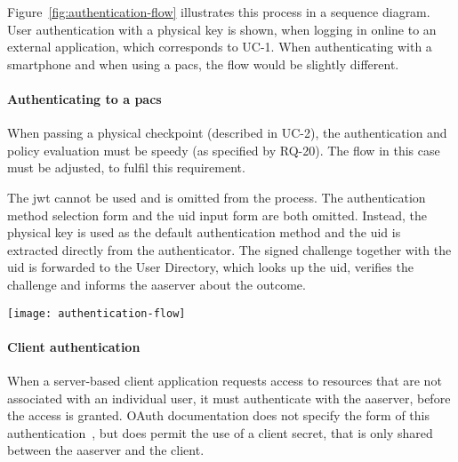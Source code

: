 Figure~\ref{fig:authentication-flow} illustrates this process in a sequence diagram. User authentication with a physical key is shown, when logging in online to an external application, which corresponds to UC-1. When authenticating with a smartphone and when using a \acrshort{pacs}, the flow would be slightly different.

\paragraph{Authenticating to a \acrshort{pacs}} 
When passing a physical checkpoint (described in UC-2), the authentication and policy evaluation must be speedy (as specified by RQ-20). The flow in this case must be adjusted, to fulfil this requirement.

The \acrshort{jwt} cannot be used and is omitted from the process. The authentication method selection form and the \acrshort{uid} input form are both omitted. Instead, the physical key is used as the default authentication method and the \acrshort{uid} is extracted directly from the authenticator. The signed challenge together with the \acrshort{uid} is forwarded to the User Directory, which looks up the \acrshort{uid}, verifies the challenge and informs the \acrshort{aaserver} about the outcome.

\begin{sidewaysfigure}[tpb]
    \centering
    \texttt{[image: authentication-flow]}
    \caption{Authentication flow during online access control with a server-based client, using a physical authenticator. If the authentication is not successful, the \acrshort{aaserver} informs the client and the user about the unsuccessful authentication and does not continue to the Access policy evaluation stage.}
    \label{fig:authentication-flow}
\end{sidewaysfigure}
\restoregeometry

\paragraph{Client authentication}
When a server-based client application requests access to resources that are not associated with an individual user, it must authenticate with the \acrshort{aaserver}, before the access is granted. OAuth documentation does not specify the form of this authentication~\cite{Hardt2012TheFramework}, but does permit the use of a client secret, that is only shared between the \acrshort{aaserver} and the client.

